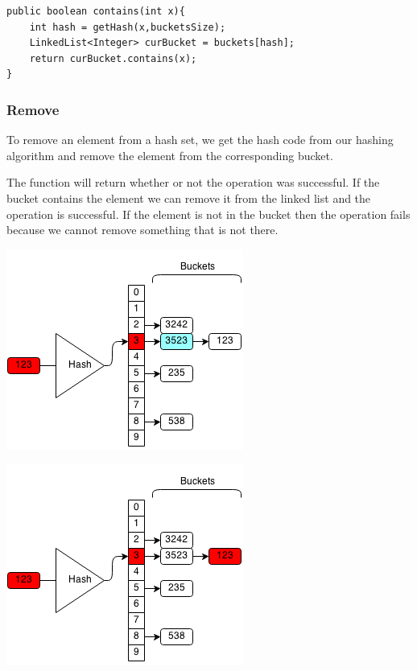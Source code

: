 \documentclass[11pt,oneside]{book}
\makeatletter
\def\maxwidth#1{\ifdim\Gin@nat@width>#1 #1\else\Gin@nat@width\fi}
\makeatother
\begin{document}
\begin{lstlisting}
public boolean contains(int x){
    int hash = getHash(x,bucketsSize);
    LinkedList<Integer> curBucket = buckets[hash];
    return curBucket.contains(x);
}
\end{lstlisting}

\subsubsection{Remove}

To remove an element from a hash set, we get the hash code from our hashing algorithm and remove the element from the corresponding bucket.

The function will return whether or not the operation was successful. If the bucket contains the element we can remove it from the linked list and the operation is successful. If the element is not in the bucket then the operation fails because we cannot remove something that is not there.

\vspace{5px}\includegraphics[width=\maxwidth{\textwidth}]{hashsetrem.png}

\vspace{5px}\includegraphics[width=\maxwidth{\textwidth}]{hashsetrem2.png}
\end{document}
